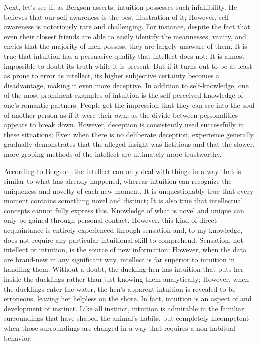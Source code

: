 \documentclass[a4paper,12pt]{book}[2004/02/16]
\theoremstyle{ilemma}
\theoremstyle{itheorem}
\theoremstyle{iother}
\theoremstyle{icorollary}
\theoremstyle{numcorollary}
\theoremstyle{idefinition}
\begin{document}
Next, let's see if, as Bergson asserts, intuition possesses such infallibility. He believes that our self-awareness is the best illustration of it; However, self-awareness is notoriously rare and challenging. For instance, despite the fact that even their closest friends are able to easily identify the meannesses, vanity, and envies that the majority of men possess, they are largely unaware of them. It is true that intuition has a persuasive quality that intellect does not: It is almost impossible to doubt its truth while it is present. But if it turns out to be at least as prone to error as intellect, its higher subjective certainty becomes a disadvantage, making it even more deceptive.
In addition to self-knowledge, one of the most prominent examples of intuition is the self-perceived knowledge of one's romantic partners: People get the impression that they can see into the soul of another person as if it were their own, as the divide between personalities appears to break down. However, deception is consistently used successfully in these situations; Even when there is no deliberate deception, experience generally gradually demonstrates that the alleged insight was fictitious and that the slower, more groping methods of the intellect are ultimately more trustworthy.

According to Bergson, the intellect can only deal with things in a way that is similar to what has already happened, whereas intuition can recognize the uniqueness and novelty of each new moment. It is unquestionably true that every moment contains something novel and distinct; It is also true that intellectual concepts cannot fully express this.
Knowledge of what is novel and unique can only be gained through personal contact.
However, this kind of direct acquaintance is entirely experienced through sensation and, to my knowledge, does not require any particular intuitional skill to comprehend. Sensation, not intellect or intuition, is the source of new information; However, when the data are brand-new in any significant way, intellect is far superior to intuition in handling them. Without a doubt, the duckling hen has intuition that puts her inside the ducklings rather than just knowing them analytically; However, when the ducklings enter the water, the hen's apparent intuition is revealed to be erroneous, leaving her helpless on the shore. In fact, intuition is an aspect of and development of instinct. Like all instinct, intuition is admirable in the familiar surroundings that have shaped the animal's habits, but completely incompetent when those surroundings are changed in a way that requires a non-habitual behavior.
\end{document}
